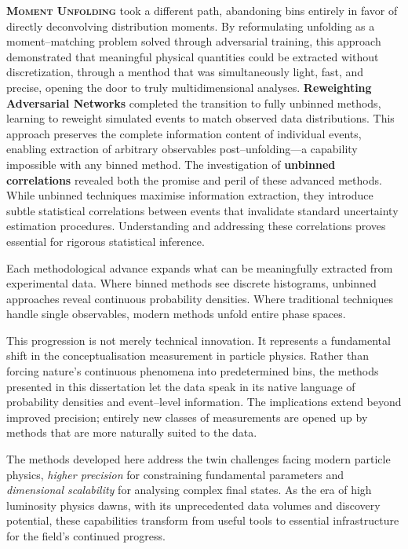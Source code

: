     \textbf{\textsc{Moment Unfolding}} took a different path, abandoning bins entirely in favor of directly deconvolving distribution moments.
    By reformulating unfolding as a moment--matching problem solved through adversarial training, this approach demonstrated that meaningful physical quantities could be extracted without discretization, through a menthod that was simultaneously light, fast, and precise, opening the door to truly multidimensional analyses.
    \textbf{Reweighting Adversarial Networks} completed the transition to fully unbinned methods, learning to reweight simulated events to match observed data distributions.
    This approach preserves the complete information content of individual events, enabling extraction of arbitrary observables post--unfolding—a capability impossible with any binned method.
    The investigation of \textbf{unbinned correlations} revealed both the promise and peril of these advanced methods.
    While unbinned techniques maximise information extraction, they introduce subtle statistical correlations between events that invalidate standard uncertainty estimation procedures.
    Understanding and addressing these correlations proves essential for rigorous statistical inference.
    
    Each methodological advance expands what can be meaningfully extracted from experimental data.
    Where binned methods see discrete histograms, unbinned approaches reveal continuous probability densities.
    Where traditional techniques handle single observables, modern methods unfold entire phase spaces.

    This progression is not merely technical innovation.
    It represents a fundamental shift in the conceptualisation measurement in particle physics.
    Rather than forcing nature's continuous phenomena into predetermined bins, the methods presented in this dissertation let the data speak in its native language of probability densities and event--level information.
    The implications extend beyond improved precision; entirely new classes of measurements are opened up by methods that are more naturally suited to the data.

    The methods developed here address the twin challenges facing modern particle physics, \emph{higher precision} for constraining fundamental parameters and \emph{dimensional scalability} for analysing complex final states.
    As the era of high luminosity physics dawns, with its unprecedented data volumes and discovery potential, these capabilities transform from useful tools to essential infrastructure for the field's continued progress.

